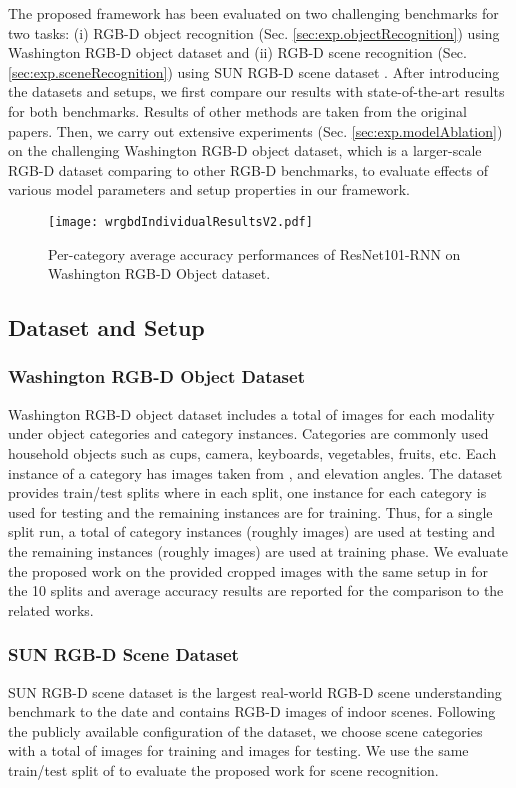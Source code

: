 The proposed framework has been evaluated on two challenging benchmarks for two tasks: (i) RGB-D object recognition (Sec. \ref{sec:exp.objectRecognition}) using Washington RGB-D object dataset \citep{Lai_ICRA_2011} and (ii) RGB-D scene recognition (Sec. \ref{sec:exp.sceneRecognition}) using SUN RGB-D scene dataset \citep{Song_CVPR_2015}. After introducing the datasets and setups, we first compare our results with state-of-the-art results for both benchmarks. Results of other methods are taken from the original papers. Then, we carry out extensive experiments (Sec. \ref{sec:exp.modelAblation}) on the challenging Washington RGB-D object dataset, which is a larger-scale RGB-D dataset comparing to other RGB-D benchmarks, to evaluate effects of various model parameters and setup properties in our framework.
\begin{figure*}[!ht]
	\begin{center}
		\texttt{[image: wrgbdIndividualResultsV2.pdf]}
	\end{center}
	\caption{Per-category average accuracy performances of ResNet101-RNN on Washington RGB-D Object dataset.}
	\label{fig:wrgbdIndividualResults}
\end{figure*}
\subsection{Dataset and Setup} \label{sec:exp.datasets}
\subsubsection{Washington RGB-D Object Dataset}
Washington RGB-D object dataset includes a total of  images for each modality under  object categories and  category instances. Categories are commonly used household objects such as cups, camera, keyboards, vegetables, fruits, etc. Each instance of a category has images taken from ,  and  elevation angles. The dataset provides  train/test splits where in each split, one instance for each category is used for testing and the remaining instances are for training. Thus, for a single split run, a total of  category instances (roughly  images) are used at testing and the remaining  instances (roughly  images) are used at training phase. We evaluate the proposed work on the provided cropped images with the same setup in \cite{Lai_ICRA_2011} for the 10 splits and average accuracy results are reported for the comparison to the related works.
\subsubsection{SUN RGB-D Scene Dataset}
SUN RGB-D scene dataset is the largest real-world RGB-D scene understanding benchmark to the date and  contains RGB-D images of indoor scenes. Following the publicly available configuration of the dataset, we choose  scene categories with a total of  images for training and  images for testing. We use the same train/test split of \cite{Song_CVPR_2015} to evaluate the proposed work for scene recognition.

